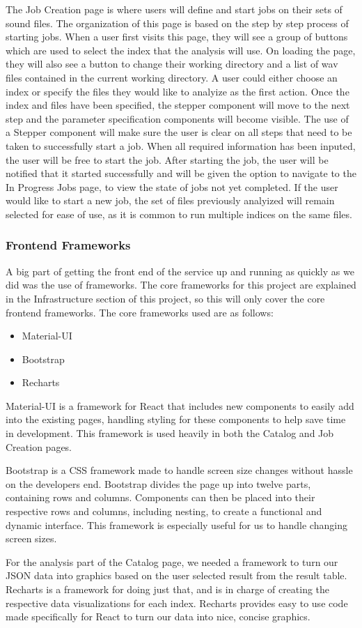 The Job Creation page is where users will define and start jobs on their sets of sound files. The organization of this page is based on the step by step process of starting jobs. When a user first visits this page, they will see a group of buttons which are used to select the index that the analysis will use. On loading the page, they will also see a button to change their working directory and a list of wav files contained in the current working directory. A user could either choose an index or specify the files they would like to analyize as the first action. Once the index and files have been specified, the stepper component will move to the next step and the parameter specification components will become visible. The use of a Stepper component will make sure the user is clear on all steps that need to be taken to successfully start a job. When all required information has been inputed, the user will be free to start the job. After starting the job, the user will be notified that it started successfully and will be given the option to navigate to the In Progress Jobs page, to view the state of jobs not yet completed. If the user would like to start a new job, the set of files previously analyized will remain selected for ease of use, as it is common to run multiple indices on the same files.

\subsubsection{Frontend Frameworks}
A big part of getting the front end of the service up and running as quickly as we did was the use of frameworks. The core frameworks for this project are explained in the Infrastructure section of this project, so this will only cover the core frontend frameworks. The core frameworks used are as follows:
\begin{itemize}
  \item Material-UI
  \item Bootstrap
  \item Recharts
\end{itemize}
Material-UI is a framework for React that includes new components to easily add into the existing pages, handling styling for these components to help save time in development. This framework is used heavily in both the Catalog and Job Creation pages.\par
Bootstrap is a CSS framework made to handle screen size changes without hassle on the developer\textquotesingle s end. Bootstrap divides the page up into twelve parts, containing rows and columns. Components can then be placed into their respective rows and columns, including nesting, to create a functional and dynamic interface. This framework is especially useful for us to handle changing screen sizes.\par
For the analysis part of the Catalog page, we needed a framework to turn our JSON data into graphics based on the user selected result from the result table. Recharts is a framework for doing just that, and is in charge of creating the respective data visualizations for each index. Recharts provides easy to use code made specifically for React to turn our data into nice, concise graphics.
